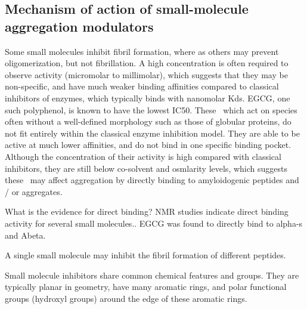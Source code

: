 \subsection{Mechanism of action of small-molecule aggregation modulators}

Some small molecules inhibit fibril formation, where as others may prevent oligomerization, but not fibrillation. A high concentration is often required to observe activity (micromolar to millimolar), which suggests that they may be non-specific, and have much weaker binding affinities compared to classical inhibitors of enzymes, which typically binds with nanomolar Kds. EGCG, one such polyphenol, is known to have the lowest IC50.  These \smi\ which act on species often without a well-defined morphology such as those of globular proteins, do not fit entirely within the classical enzyme inhibition model. They are able to be active at much lower affinities, and do not bind in one specific binding pocket.  Although the concentration of their activity is high compared with classical inhibitors,  they are still below co-solvent and osmlarity levels, which suggests these \smi\ may affect aggregation by directly binding to amyloidogenic peptides and / or aggregates.

What is the evidence for direct binding? NMR studies indicate direct binding activity for several small molecules.\cite{XXX EGCG paper nature 2007}.  EGCG was found to directly bind to alpha-s and Abeta.

A single small molecule may inhibit the fibril formation of different peptides.

Small molecule inhibitors share common chemical features and groups.  They are typically planar in geometry, have many aromatic rings, and polar functional groups (hydroxyl groups) around the edge of these aromatic rings.\cite{Stempler:2011dy,Shoval:2007p3547,Porat:2006fn,Lemkul:2012da}

